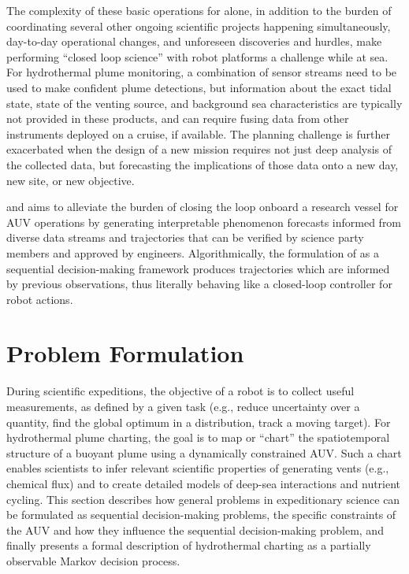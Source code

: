 The complexity of these basic operations for \Sentry alone, in addition to the burden of coordinating several other ongoing scientific projects happening simultaneously, day-to-day operational changes, and unforeseen discoveries and hurdles, make performing ``closed loop science'' with robot platforms a challenge while at sea. For hydrothermal plume monitoring, a combination of sensor streams need to be used to make confident plume detections\autocite{jakuba2007stochastic}, but information about the exact tidal state, state of the venting source, and background sea characteristics are typically not provided in these products, and can require fusing data from other instruments deployed on a cruise, if available. The planning challenge is further exacerbated when the design of a new mission requires not just deep analysis of the collected data, but forecasting the implications of those data onto a new day, new site, or new objective. 

\PHUMES and \PHORTEX aims to alleviate the burden of closing the loop onboard a research vessel for AUV operations by generating interpretable phenomenon forecasts informed from diverse data streams and trajectories that can be verified by science party members and approved by \Sentry engineers. Algorithmically, the formulation of \PHORTEX as a sequential decision-making framework produces trajectories which are informed by previous observations, thus literally behaving like a closed-loop controller for robot actions. %

\section{Problem Formulation}
\label{sec:problem}
During scientific expeditions, the objective of a robot is to collect useful measurements, as defined by a given task (e.g., reduce uncertainty over a quantity, find the global optimum in a distribution, track a moving target). For hydrothermal plume charting, the goal is to map or ``chart'' the spatiotemporal structure of a buoyant plume using a dynamically constrained AUV. Such a chart enables scientists to infer relevant scientific properties of generating vents (e.g., chemical flux) and to create detailed models of deep-sea interactions and nutrient cycling. This section describes how general problems in expeditionary science can be formulated as sequential decision-making problems, the specific constraints of the AUV \Sentry and how they influence the sequential decision-making problem, and finally presents a formal description of hydrothermal charting as a partially observable Markov decision process. 

